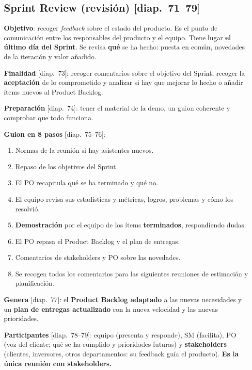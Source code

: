 \documentclass[11pt,a4paper,oneside,openany]{report}
\newcommand{\diap}[1]{\textcolor{mdaPrimary}{\small[diap.~#1]}}
\begin{document}
\subsection{Sprint Review (revisión) \diap{71--79}}
\textbf{Objetivo}: recoger \emph{feedback} sobre el estado del producto. Es el punto de comunicación entre los
responsables del producto y el equipo. Tiene lugar \textbf{el último día del Sprint}. Se revisa \textbf{qué} se ha
hecho: puesta en común, novedades de la iteración y valor añadido.

\textbf{Finalidad} \diap{73}: recoger comentarios sobre el objetivo del Sprint, recoger la \textbf{aceptación} de lo
comprometido y analizar si hay que mejorar lo hecho o añadir ítems nuevos al Product Backlog.

\textbf{Preparación} \diap{74}: tener el material de la demo, un guion coherente y comprobar que todo funciona.

\textbf{Guion en 8 pasos} \diap{75--76}:
\begin{enumerate}[leftmargin=*,itemsep=1pt]
  \item Normas de la reunión si hay asistentes nuevos.
  \item Repaso de los objetivos del Sprint.
  \item El PO recapitula qué se ha terminado y qué no.
  \item El equipo revisa sus estadísticas y métricas, logros, problemas y cómo los resolvió.
  \item \textbf{Demostración} por el equipo de los ítems \textbf{terminados}, respondiendo dudas.
  \item El PO repasa el Product Backlog y el plan de entregas.
  \item Comentarios de stakeholders y PO sobre las novedades.
  \item Se recogen todos los comentarios para las siguientes reuniones de estimación y planificación.
\end{enumerate}
\textbf{Genera} \diap{77}: el \textbf{Product Backlog adaptado} a las nuevas necesidades y un \textbf{plan de entregas
actualizado} con la nueva velocidad y las nuevas prioridades.

\textbf{Participantes} \diap{78--79}: equipo (presenta y responde), SM (facilita), PO (voz del cliente: qué se ha
cumplido y prioridades futuras) y \textbf{stakeholders} (clientes, inversores, otros departamentos: su feedback guía el
producto). \textbf{Es la única reunión con stakeholders.}
\end{document}
